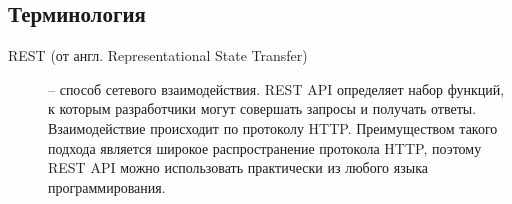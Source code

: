 \subsection{Терминология}
\begin{description}
  \item[REST (от англ. Representational State Transfer)] -- способ сетевого
    взаимодействия.  REST API определяет набор функций, к которым разработчики
    могут совершать запросы и получать ответы. Взаимодействие происходит по
    протоколу HTTP.  Преимуществом такого подхода является широкое
    распространение протокола HTTP, поэтому REST API можно использовать
    практически из любого языка программирования.
\end{description}

